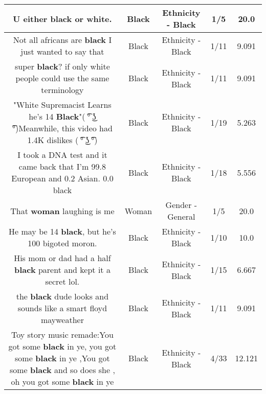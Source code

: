 \documentclass[11pt]{article}
\newlength\mylength
\begin{document}
\begin{center}
\begin{longtable}{|C{.65\mylength}|C{.30\mylength}|C{.12\mylength}|C{.12\mylength}|C{.12\mylength}|}
  \small U either \textbf{black} or white.\normalsize   & Black & Ethnicity - Black & 1/5 & 20.0 \\  \hline
  \small Not all africans are \textbf{black} I just wanted to say that\normalsize   & Black & Ethnicity - Black & 1/11 & 9.091 \\  \hline
  \small super \textbf{black}? if only white people could use the same terminology\normalsize   & Black & Ethnicity - Black & 1/11 & 9.091 \\  \hline
  \small "White Supremacist Learns he's 14 \textbf{Black}"( ͡° ͜ʖ ͡°)Meanwhile, this video had 1.4K dislikes ( ͡° ͜ʖ ͡°)\normalsize   & Black & Ethnicity - Black & 1/19 & 5.263 \\  \hline
  \small I took a DNA test and it came back that I'm 99.8 European and 0.2 Asian. 0.0 black\normalsize   & Black & Ethnicity - Black & 1/18 & 5.556 \\  \hline
  \small That \textbf{woman} laughing is me\normalsize   & Woman & Gender - General & 1/5 & 20.0 \\  \hline
  \small He may be 14 \textbf{black}, but he's 100  bigoted moron.\normalsize   & Black & Ethnicity - Black & 1/10 & 10.0 \\  \hline
  \small His mom or dad had a half \textbf{black} parent  and kept it a secret lol.\normalsize   & Black & Ethnicity - Black & 1/15 & 6.667 \\  \hline
  \small the \textbf{black} dude looks and sounds like a smart floyd mayweather\normalsize   & Black & Ethnicity - Black & 1/11 & 9.091 \\  \hline
  \small Toy story music remade:You got some \textbf{black} in ye, you got some \textbf{black} in ye ,You got some \textbf{black} and so does she , oh you got some \textbf{black} in ye\normalsize   & Black & Ethnicity - Black & 4/33 & 12.121 \\  \hline

\end{longtable}
\end{center}
\end{document}
